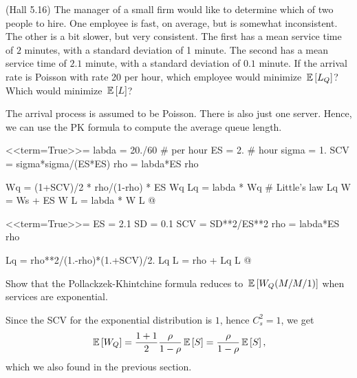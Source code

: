 \begin{question}
  (Hall 5.16) The manager of a small firm would like to determine
  which of two people to hire. One employee is fast, on average, but
  is somewhat inconsistent. The other is a bit slower, but very
  consistent. The first has a mean service time of $2$ minutes, with a
  standard deviation of 1 minute. The second has a mean service time
  of $2.1$ minute, with a standard deviation of $0.1$ minute. If the arrival rate is Poisson with rate 20 per hour, which employee would minimize $\,\mathbb{E}\left[L_Q\right]$? Which would minimize $\,\mathbb{E}\left[L\right]$? 

  \begin{solution}
    
    The arrival process is assumed to be Poisson. There is also
    just one server. Hence, we can use the PK formula to compute the average queue length.

<<term=True>>=
labda = 20./60 # per hour
ES = 2. # hour
sigma = 1.
SCV = sigma*sigma/(ES*ES)
rho = labda*ES
rho

Wq = (1+SCV)/2 * rho/(1-rho) * ES
Wq
Lq = labda * Wq # Little's law
Lq
W = Ws + ES
W
L = labda * W
L
@ 


<<term=True>>=
ES = 2.1
SD = 0.1
SCV = SD**2/ES**2
rho = labda*ES
rho

Lq = rho**2/(1.-rho)*(1.+SCV)/2.
Lq
L = rho + Lq
L
@ 

  \end{solution}

\end{question}

\begin{question}
 Show that the Pollackzek-Khintchine formula reduces to
    $\,\mathbb{E}\left[W_Q(M/M/1)\right]$ when services are exponential.
    \begin{solution}
      Since the SCV for the exponential distribution is $1$, hence
      $C_s^2=1$, we get 
    \begin{equation*}
\,\mathbb{E}\left[W_Q\right] = \frac{1+1}2\frac{\rho}{1-\rho} \,\mathbb{E}\left[S\right] = \frac{\rho}{1-\rho} \,\mathbb{E}\left[S\right],
    \end{equation*}
which we also found in the previous section.
    \end{solution}
\end{question}


